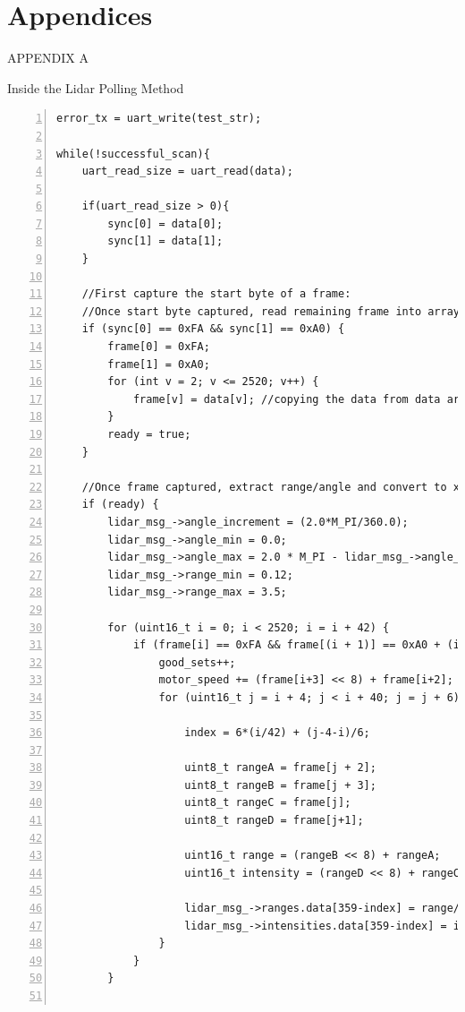 \documentclass[conference]{IEEEtran}
\begin{document}
\section{Appendices}
\begin{center}APPENDIX A
\end{center}
\begin{center}Inside the Lidar Polling Method
\end{center}
\begin{lstlisting}[frame=leftline, breaklines=true, numbers=left, stepnumber=1, numbersep=5pt]
error_tx = uart_write(test_str);

while(!successful_scan){
    uart_read_size = uart_read(data);
        
    if(uart_read_size > 0){
        sync[0] = data[0];
        sync[1] = data[1];
    }
    
    //First capture the start byte of a frame:
    //Once start byte captured, read remaining frame into array:
    if (sync[0] == 0xFA && sync[1] == 0xA0) {
        frame[0] = 0xFA;
        frame[1] = 0xA0;
        for (int v = 2; v <= 2520; v++) {
            frame[v] = data[v]; //copying the data from data array to frame
        }
        ready = true;
    }  
    
    //Once frame captured, extract range/angle and convert to x/y:
    if (ready) {
        lidar_msg_->angle_increment = (2.0*M_PI/360.0);
        lidar_msg_->angle_min = 0.0;
        lidar_msg_->angle_max = 2.0 * M_PI - lidar_msg_->angle_increment;
        lidar_msg_->range_min = 0.12;
        lidar_msg_->range_max = 3.5;
        
        for (uint16_t i = 0; i < 2520; i = i + 42) {
            if (frame[i] == 0xFA && frame[(i + 1)] == 0xA0 + (i / 42)) {                    
                good_sets++;
                motor_speed += (frame[i+3] << 8) + frame[i+2]; //accumlate count for avg. time increment
                for (uint16_t j = i + 4; j < i + 40; j = j + 6) {
                
                    index = 6*(i/42) + (j-4-i)/6;

                    uint8_t rangeA = frame[j + 2];
                    uint8_t rangeB = frame[j + 3];
                    uint8_t rangeC = frame[j];
                    uint8_t rangeD = frame[j+1];

                    uint16_t range = (rangeB << 8) + rangeA;
                    uint16_t intensity = (rangeD << 8) + rangeC; 

                    lidar_msg_->ranges.data[359-index] = range/1000.0;
                    lidar_msg_->intensities.data[359-index] = intensity;
                }
            }
        }
        

\end{lstlisting}
\end{document}
